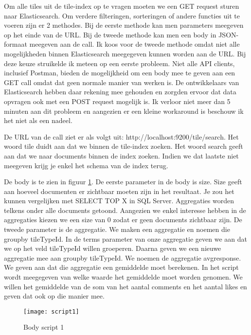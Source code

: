 Om alle tiles uit de tile-index op te vragen moeten we een GET request sturen naar Elasticsearch. Om verdere filteringen, sorteringen of andere functies uit te voeren zijn er 2 methodes. Bij de eerste methode kan men parameters meegeven op het einde van de URL. Bij de tweede methode kan men een body in JSON-formaat meegeven aan de call. Ik koos voor de tweede methode omdat niet alle mogelijkheden binnen Elasticsearch meegegeven kunnen worden aan de URL. Bij deze keuze struikelde ik meteen op een eerste probleem. Niet alle API clients, inclusief Postman, bieden de mogelijkheid om een body mee te geven aan een GET call omdat dat geen normale manier van werken is. De ontwikkelaars van Elasticsearch hebben daar rekening mee gehouden en zorgden ervoor dat data opvragen ook met een POST request mogelijk is. Ik verloor niet meer dan 5 minuten aan dit probleem en aangezien er een kleine workaround is beschouw ik het niet als een nadeel.

De URL van de call ziet er als volgt uit: http://localhost:9200/tile/\textunderscore search. Het woord tile duidt aan dat we binnen de tile-index zoeken. Het woord \textunderscore search geeft aan dat we naar documents binnen de index zoeken. Indien we dat laatste niet meegeven krijg je enkel het schema van de index terug.

De body is te zien in figuur \ref{fig:script1}. De eerste parameter in de body is size. Size geeft aan hoeveel documenten er zichtbaar moeten zijn in het resultaat. Je zou het kunnen vergelijken met SELECT TOP X in SQL Server. Aggregaties worden telkens onder alle documents getoond. Aangezien we enkel interesse hebben in de aggregaties kiezen we een size van 0 zodat er geen documents zichtbaar zijn. De tweede parameter is de aggregatie. We maken een aggregatie en noemen die group\textunderscore by \textunderscore tileTypeId. In de terms parameter van onze aggregatie geven we aan dat we op het veld tileTypeId willen groeperen. Daarna geven we een nieuwe aggregatie mee aan group\textunderscore by \textunderscore tileTypeId. We noemen de aggregatie avg\textunderscore response. We geven aan dat die aggregatie een gemiddelde moet berekenen. In het script wordt meegegeven van welke waarde het gemiddelde moet worden genomen. We willen het gemiddelde van de som van het aantal comments en het aantal likes en geven dat ook op die manier mee.

\begin{figure}
	\centering
	\texttt{[image: script1]}
	\caption{Body script 1}
	\label{fig:script1}
\end{figure}

